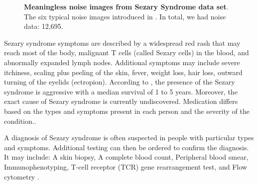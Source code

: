 \begin{figure}[ht]
\begin{center}
\begin{subfigure}[b]{0.25\textwidth}
			\label{fig:Good Cell}
		\end{subfigure}
	\end{center}
	\caption{\textbf{Meaningless noise images from Sezary Syndrome data set}.  The six typical noise images introduced in \eg{}. In total, we had noise data: 12,695.}
	\label{fig:4.4}
\end{figure}

Sezary syndrome symptoms are described by a widespread red rash that may reach most of the body, malignant T cells (called Sezary cells) in the blood, and abnormally expanded lymph nodes. Additional symptoms may include severe itchiness, scaling plus peeling of the skin, fever, weight loss, hair loss, outward turning of the eyelids (ectropion). According to \cite{10.1182/blood-2004-09-3502}\cite{20001195667}, the presence of the Sezary syndrome is aggressive with a median survival of 1 to 5 years. Moreover, the exact cause of Sezary syndrome is currently undiscovered. Medication differs based on the types and symptoms present in each person and the severity of the condition.\cite{Yamashita}.

A diagnosis of Sezary syndrome is often suspected in people with particular types and symptoms. Additional testing can then be ordered to confirm the diagnosis. It may include: A skin biopsy, A complete blood count, Peripheral blood smear, Immunophenotyping, T-cell receptor (TCR) gene rearrangement test, and Flow cytometry \cite{Alain}.


